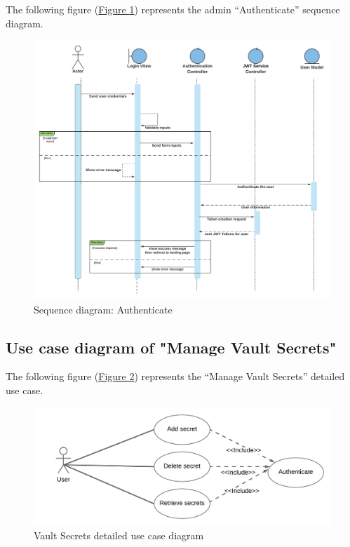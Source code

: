 The following figure (\hyperref[fig:login_seq2]{Figure \ref{fig:login_seq2}})  represents the admin ``Authenticate'' sequence diagram.
\begin{figure}[h]
  \center
  \includegraphics[width=14cm]{./chapters/sprint1/login_seq2.png}
  \caption{Sequence diagram: Authenticate}
  \label{fig:login_seq2}
\end{figure}
\vspace*{5cm}

\subsection{Use case diagram of "Manage Vault Secrets"}

The following figure (\hyperref[fig:use_case-manage_vault]{Figure \ref{fig:use_case-manage_vault}})  represents the ``Manage Vault Secrets'' detailed use case.
\begin{figure}[h]
  \center
  \includegraphics[width=14cm]{./chapters/sprint1/use_case-manage_vault.png}
  \caption{Vault Secrets detailed use case diagram}
  \label{fig:use_case-manage_vault}
\end{figure}
\vspace*{6cm}

